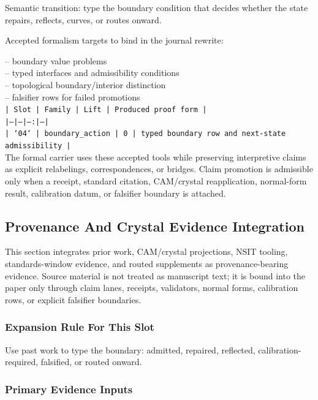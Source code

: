 \documentclass[11pt]{article}
\begin{document}
Semantic transition: type the boundary condition that decides whether the state repairs, reflects, curves, or routes onward.

Accepted formalism targets to bind in the journal rewrite:

\noindent{}-- boundary value problems\\
\noindent{}-- typed interfaces and admissibility conditions\\
\noindent{}-- topological boundary/interior distinction\\
\noindent{}-- falsifier rows for failed promotions\\

\noindent\texttt{| Slot | Family | Lift | Produced proof form |}\\
\noindent\texttt{|---|---|---:|---|}\\
\noindent\texttt{| `04` | boundary\_action | 0 | typed boundary row and next-state admissibility |}\\

The formal carrier uses these accepted tools while preserving interpretive
claims as explicit relabelings, correspondences, or bridges. Claim promotion is admissible only when a receipt, standard citation,
CAM/crystal reapplication, normal-form result, calibration datum, or falsifier
boundary is attached.

\subsection*{Provenance And Crystal Evidence Integration}

This section integrates prior work, CAM/crystal projections, NSIT tooling,
standards-window evidence, and routed supplements as provenance-bearing
evidence. Source material is not treated as manuscript text; it is bound into
the paper only through claim lanes, receipts, validators, normal forms,
calibration rows, or explicit falsifier boundaries.

\subsubsection*{Expansion Rule For This Slot}

Use past work to type the boundary: admitted, repaired, reflected, calibration-required, falsified, or routed onward.

\subsubsection*{Primary Evidence Inputs}
\end{document}
